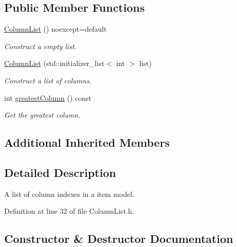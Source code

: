 \subsection*{Public Member Functions}
\begin{DoxyCompactItemize}
\item 
\hyperlink{class_mdt_1_1_item_model_1_1_column_list_a97097c9333625e619f64405e125f31ba}{Column\+List} () noexcept=default\hypertarget{class_mdt_1_1_item_model_1_1_column_list_a97097c9333625e619f64405e125f31ba}{}\label{class_mdt_1_1_item_model_1_1_column_list_a97097c9333625e619f64405e125f31ba}

\begin{DoxyCompactList}\small\item\em Construct a empty list. \end{DoxyCompactList}\item 
\hyperlink{class_mdt_1_1_item_model_1_1_column_list_a1d44fa21bb6756af2333ffd30679e3bc}{Column\+List} (std\+::initializer\+\_\+list$<$ int $>$ list)
\begin{DoxyCompactList}\small\item\em Construct a list of columns. \end{DoxyCompactList}\item 
int \hyperlink{class_mdt_1_1_item_model_1_1_column_list_a35d99eaaf6f1860a53e7d7af05b38cc0}{greatest\+Column} () const 
\begin{DoxyCompactList}\small\item\em Get the greatest column. \end{DoxyCompactList}\end{DoxyCompactItemize}
\subsection*{Additional Inherited Members}


\subsection{Detailed Description}
A list of column indexes in a item model. 

Definition at line 32 of file Column\+List.\+h.



\subsection{Constructor \& Destructor Documentation}

